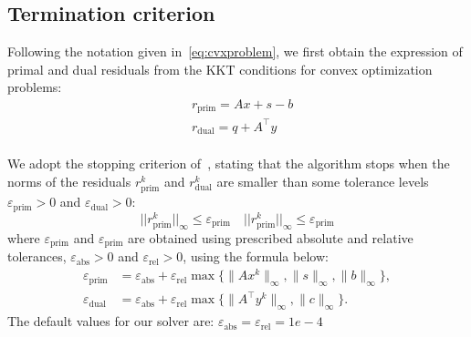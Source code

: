\subsection{Termination criterion}

Following the notation given in~\eqref{eq:cvxproblem}, we first obtain the expression of primal and dual residuals from the KKT conditions for convex optimization problems:
\begin{equation}
\begin{aligned}
& r_\text{prim} = Ax + s - b\\
& r_\text{dual} = q + A^\top y\\
\end{aligned}
\label{eq:res}
\end{equation}

We adopt the stopping criterion of~\cite{OSQP}, stating that the algorithm stops when the norms of the residuals $r_\mathrm{prim}^k$ and $r_\mathrm{dual}^k$ are smaller than some tolerance levels $\varepsilon_\mathrm{prim}>0$ and $\varepsilon_\mathrm{dual}>0$:
\begin{equation}
||r_\mathrm{prim}^k||_{\infty} \leq \varepsilon_\mathrm{prim} \quad ||r_\mathrm{prim}^k||_{\infty} \leq \varepsilon_\mathrm{prim} 
\end{equation} where $\varepsilon_\mathrm{prim}$ and $\varepsilon_\mathrm{prim}$ are obtained using prescribed absolute and relative tolerances, $\varepsilon_\mathrm{abs}>0 $ and $\varepsilon_\mathrm{rel} > 0$, using the formula below:
\begin{align}
  \varepsilon_{\mathrm{prim}} &= \varepsilon_{\mathrm{abs}}
    + \varepsilon_{\mathrm{rel}} \max \{ \| A x^k \|_{\infty}, \|s\|_{\infty}, \|b\|_{\infty} \}, \\
  \varepsilon_{\mathrm{dual}} &= \varepsilon_{\mathrm{abs}}
    + \varepsilon_{\mathrm{rel}} \max \{ \| A^\top y^k \|_{\infty}, \|c\|_{\infty} \}.
\end{align} The default values for our solver are: $\varepsilon_\mathrm{abs} = \varepsilon_\mathrm{rel} = 1e-4$


